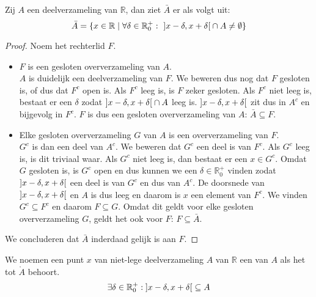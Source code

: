\documentclass[main.tex]{subfiles}
\begin{document}
\begin{pr}
  Zij $A$ een deelverzameling van $\mathbb{R}$, dan ziet $\bar{A}$ er als volgt uit:
  \[ \bar{A} = \{ x\in \mathbb{R} \mid \forall \delta \in \mathbb{R}_{0}^{+}:\ \interval[open]{x-\delta}{ x+\delta} \cap A \neq \emptyset \} \]

  \begin{proof}
    Noem het rechterlid $F$.
    \begin{itemize}
    \item $F$ is een gesloten oververzameling van $A$.\\
      $A$ is duidelijk een deelverzameling van $F$.
      We beweren dus nog dat $F$ gesloten is, of dus dat $F^{c}$ open is.
      Als $F^{c}$ leeg is, is $F$ zeker gesloten.
      Als $F^{c}$ niet leeg is, bestaat er een $\delta$ zodat $\interval[open]{x-\delta}{x+\delta} \cap A$ leeg is.
      $\interval[open]{x-\delta}{x+\delta}$ zit dus in $A^{c}$ en bijgevolg in $F^{c}$.\waarom
      $F$ is dus een gesloten oververzameling van $A$: $\bar{A} \subseteq F$.
    \item Elke gesloten oververzameling $G$ van $A$ is een oververzameling van $F$.\\
      $G^{c}$ is dan een deel van $A^{c}$.
      We beweren dat $G^{c}$ een deel is van $F^{c}$.
      Als $G^{c}$ leeg is, is dit triviaal waar.
      Als $G^{c}$ niet leeg is, dan bestaat er een $x\in G^{c}$.
      Omdat $G$ gesloten is, is $G^{c}$ open en dus kunnen we een $\delta \in \mathbb{R}_{0}^{+}$ vinden zodat $\interval[open]{x-\delta}{x+\delta}$ een deel is van $G^{c}$ en dus van $A^{c}$.
      De doorsnede van $\interval[open]{x-\delta}{x+\delta}$ en $A$ is dus leeg en daarom is $x$ een element van $F^{c}$.
      We vinden $G^{c}\subseteq F^{c}$ en daarom $F \subseteq G$.
      Omdat dit geldt voor elke gesloten oververzameling $G$, geldt het ook voor $F$: $F \subseteq \bar{A}$.
    \end{itemize}
    We concluderen dat $\bar{A}$ inderdaad gelijk is aan $F$.
  \end{proof}
\end{pr}

\begin{de}
  We noemen een punt $x$ van niet-lege deelverzameling $A$ van $\mathbb{R}$ een  van $A$ als het tot $\mathring{A}$ behoort.
  \[ \exists \delta \in \mathbb{R}_{0}^{+}: \interval[open]{x-\delta}{x+\delta} \subseteq A \]
\end{de}
\end{document}

